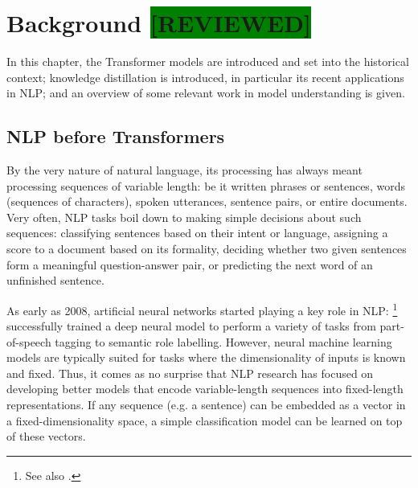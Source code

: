 \documentclass[bsc,frontabs,twoside,singlespacing,parskip,deptreport]{infthesis}
\def\reviewed{\colorbox{green}{[REVIEWED]}}
\begin{document}
\chapter{Background \reviewed}{
  \label{ch:background}

  In this chapter, the Transformer models are introduced and set into the historical context; knowledge distillation is introduced, in particular its recent applications in NLP; and an overview of some relevant work in model understanding is given.

  \section{NLP before Transformers}{
    \label{sec:pre-transformer-nlp}
    By the very nature of natural language, its processing has always meant processing sequences of variable length: be it written phrases or sentences, words (sequences of characters), spoken utterances, sentence pairs, or entire documents.
    Very often, NLP tasks boil down to making simple decisions about such sequences: classifying sentences based on their intent or language, assigning a score to a document based on its formality, deciding whether two given sentences form a meaningful question-answer pair, or predicting the next word of an unfinished sentence.

    As early as 2008, artificial neural networks started playing a key role in NLP: \citet{Collobert_Weston_2008}\footnote{See also \citet{Collobert_Weston_2011}.} successfully trained a deep neural model to perform a variety of tasks from part-of-speech tagging to semantic role labelling.
    However, neural machine learning models are typically suited for tasks where the dimensionality of inputs is known and fixed. Thus, it comes as no surprise that NLP research has focused on developing better models that encode variable-length sequences into fixed-length representations. 
    If any sequence (e.g. a sentence) can be embedded as a vector in a fixed-dimensionality space, a simple classification model can be learned on top of these vectors.
    
}}
\end{document}
